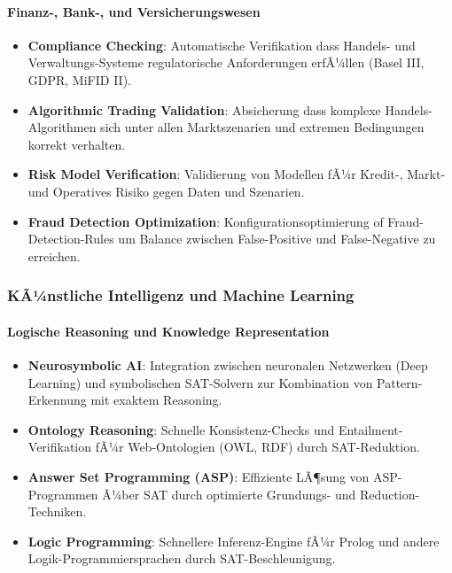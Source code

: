 ﻿\documentclass[a4paper,12pt]{article}
\theoremstyle{definition}
\begin{document}
\paragraph{Finanz-, Bank-, und Versicherungswesen}

\begin{itemize}
	\item \textbf{Compliance Checking}: Automatische Verifikation dass Handels- und Verwaltungs-Systeme regulatorische Anforderungen erfÃ¼llen (Basel III, GDPR, MiFID II).
	
	\item \textbf{Algorithmic Trading Validation}: Absicherung dass komplexe Handels-Algorithmen sich unter allen Marktszenarien und extremen Bedingungen korrekt verhalten.
	
	\item \textbf{Risk Model Verification}: Validierung von Modellen fÃ¼r Kredit-, Markt- und Operatives Risiko gegen Daten und Szenarien.
	
	\item \textbf{Fraud Detection Optimization}: Konfigurationsoptimierung of Fraud-Detection-Rules um Balance zwischen False-Positive und False-Negative zu erreichen.
\end{itemize}

\subsubsection{KÃ¼nstliche Intelligenz und Machine Learning}

\paragraph{Logische Reasoning und Knowledge Representation}

\begin{itemize}
	\item \textbf{Neurosymbolic AI}: Integration zwischen neuronalen Netzwerken (Deep Learning) und symbolischen SAT-Solvern zur Kombination von Pattern-Erkennung mit exaktem Reasoning.
	
	\item \textbf{Ontology Reasoning}: Schnelle Konsistenz-Checks und Entailment-Verifikation fÃ¼r Web-Ontologien (OWL, RDF) durch SAT-Reduktion.
	
	\item \textbf{Answer Set Programming (ASP)}: Effiziente LÃ¶sung von ASP-Programmen Ã¼ber SAT durch optimierte Grundungs- und Reduction-Techniken.
	
	\item \textbf{Logic Programming}: Schnellere Inferenz-Engine fÃ¼r Prolog und andere Logik-Programmiersprachen durch SAT-Beschleunigung.
\end{itemize}
\end{document}
